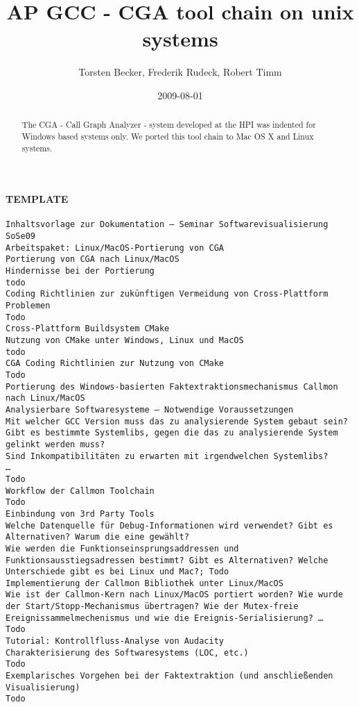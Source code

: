 \documentclass[]{article}
\title{AP GCC - CGA tool chain on unix systems}
\author{ Torsten Becker, Frederik Rudeck, Robert Timm }
\date{2009-08-01}
\begin{document}
\ifpdf {} \else {} \fi

\maketitle
\begin{abstract}
	The CGA - Call Graph Analyzer - system developed at the HPI was indented for Windows based systems only. We ported this tool chain to Mac OS X and Linux systems.
\end{abstract}


\paragraph{TEMPLATE}
\begin{verbatim}
Inhaltsvorlage zur Dokumentation – Seminar Softwarevisualisierung SoSe09
Arbeitspaket: Linux/MacOS-Portierung von CGA
Portierung von CGA nach Linux/MacOS
Hindernisse bei der Portierung
todo
Coding Richtlinien zur zukünftigen Vermeidung von Cross-Plattform Problemen
Todo
Cross-Plattform Buildsystem CMake
Nutzung von CMake unter Windows, Linux und MacOS
todo
CGA Coding Richtlinien zur Nutzung von CMake
Todo
Portierung des Windows-basierten Faktextraktionsmechanismus Callmon nach Linux/MacOS
Analysierbare Softwaresysteme – Notwendige Voraussetzungen
Mit welcher GCC Version muss das zu analysierende System gebaut sein?
Gibt es bestimmte Systemlibs, gegen die das zu analysierende System gelinkt werden muss?
Sind Inkompatibilitäten zu erwarten mit irgendwelchen Systemlibs?
…
Todo
Workflow der Callmon Toolchain
Todo
Einbindung von 3rd Party Tools 
Welche Datenquelle für Debug-Informationen wird verwendet? Gibt es Alternativen? Warum die eine gewählt?
Wie werden die Funktionseinsprungsaddressen und Funktionsausstiegsadressen bestimmt? Gibt es Alternativen? Welche Unterschiede gibt es bei Linux und Mac?; Todo
Implementierung der Callmon Bibliothek unter Linux/MacOS
Wie ist der Callmon-Kern nach Linux/MacOS portiert worden? Wie wurde der Start/Stopp-Mechanismus übertragen? Wie der Mutex-freie Ereignissammelmechenismus und wie die Ereignis-Serialisierung? …
Todo
Tutorial: Kontrollfluss-Analyse von Audacity
Charakterisierung des Softwaresystems (LOC, etc.)
Todo
Exemplarisches Vorgehen bei der Faktextraktion (und anschließenden Visualisierung)
Todo
\end{verbatim}
\end{document}
